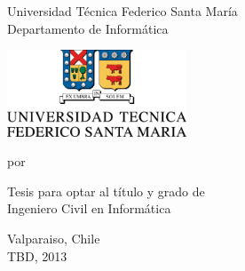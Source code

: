 \thispagestyle{empty}

\begin{center}

{\large\sc Universidad Técnica Federico Santa María}\\
{\large\sc Departamento de Informática}

\vspace{5mm}

\includegraphics[width=0.4\textwidth]{images/utfsm}
\end{center}


\begin{center}
    \begin{LARGE}
        \textbf{\titulo}
    \end{LARGE}
\end{center}


\begin{center}
{\large por}\\
{\huge \autor}
\end{center}



\begin{center}
{\large Tesis para optar al título y grado de}\\
\vspace*{10mm}
{\Large Ingeniero Civil en Informática}\\
\end{center}



\begin{center}
{\large Valparaiso, Chile}\\
{\large TBD, 2013}\\[2mm]
\end{center}


\pagebreak

